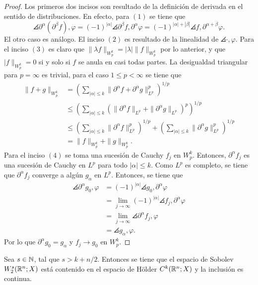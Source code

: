 \begin{proof}
	Los primeros dos incisos son resultado de la definición de derivada en el sentido de distribuciones. En efecto, para $(1)$ se tiene que 
	\begin{equation*}
		\angles{\partial^\alpha(\partial^\beta f), \varphi} = 
		(-1)^{|\alpha|} \angles{\partial^\beta f, \partial^\alpha\varphi} =
		(-1)^{|\alpha| + |\beta|} \angles{f, \partial^{\alpha+\beta}\varphi}. 
	\end{equation*}
	El otro caso es análogo. El inciso $(2)$ es resultado de la linealidad de $\angles{\cdot, \varphi}$.  Para el inciso $(3)$ es claro que $\|\lambda f\|_{W^k_p} = |\lambda|\|f\|_{W^k_p}$ por lo anterior, y que $|f\|_{W^k_p} = 0$ si y solo si $f$ se anula en casi todas partes. La desigualdad triangular para $p=\infty$ es trivial, para el caso $1\leq p<\infty$ se tiene que 
	\begin{align*}
		\|f+g\|_{W^k_p} &= \left(\sum_{|\alpha|\leq k} \|\partial^\alpha f + \partial^\alpha g\|_{L^p}^p
		\right)^{1/p} \\ 
		& \leq \left(\sum_{|\alpha|\leq k} (\|\partial^\alpha f\|_{L^p} +  \|\partial^\alpha g\|_{L^p})^p
		\right)^{1/p} \\
		& \leq \left(\sum_{|\alpha|\leq k} \|\partial^\alpha f\|_{L^p}^p
		\right)^{1/p} + \left(\sum_{|\alpha|\leq k} \|\partial^\alpha g\|_{L^p}^p
		\right)^{1/p} \\
		& = \|f\|_{W^k_p} + \|g\|_{W^k_p}.
	\end{align*}
	Para el inciso $(4)$ se toma una sucesión de Cauchy $f_j$ en $W^k_p$. Entonces, $\partial^\alpha f_j$ es una sucesión de Cauchy en $L^p$ para todo $|\alpha|\leq k$. Como $L^p$ es completo, se tiene que $\partial^\alpha f_j$ converge a algún $g_\alpha$ en $L^p$. Entonces, se tiene que
	\begin{align*}
		\angles{\partial^\alpha g_0, \varphi}& = (-1)^{|\alpha|}  \angles{g_0, \partial^\alpha \varphi} \\
		& = \lim_{j\rightarrow\infty}(-1)^{|\alpha|} \angles{f_j, \partial^\alpha \varphi} \\
		& =  \lim_{j\rightarrow\infty}\angles{\partial^\alpha f_j, \varphi} \\
		& = \angles{g_\alpha, \varphi}.
	\end{align*} 
	Por lo que $\partial^\alpha g_0 = g_\alpha$ y $f_j \rightarrow g_0$ en $W^k_p$.
\end{proof}
\begin{theorem}\label{theo:Sobolev-embedding-R}
	Sea $s\in\mathbb{N}$, tal que $s>k+n/2$. Entonces se tiene que el espacio de Sobolev $W^s_2(\mathbb{R}^n;X)$ está contenido en el espacio de H\"older $C^k(\mathbb{R}^n;X)$ y la inclusión es continua.
\end{theorem}
